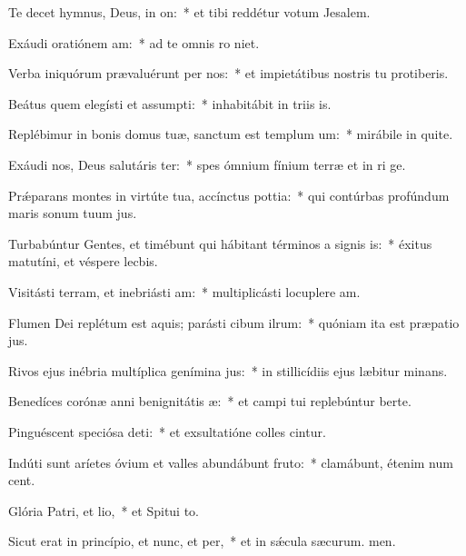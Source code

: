 \item Te decet hymnus, Deus, in on:~* et tibi reddétur votum  Jesalem.
\item Exáudi oratiónem am:~* ad te omnis ro niet.
\item Verba iniquórum prævaluérunt per nos:~* et impietátibus nostris tu protiberis.
\item Beátus quem elegísti et assumpti:~* inhabitábit in triis is.
\item Replébimur in bonis domus tuæ, sanctum est templum um:~* mirábile in quite.
\item Exáudi nos, Deus salutáris ter:~* spes ómnium fínium terræ et in ri ge.
\item Prǽparans montes in virtúte tua, accínctus pottia:~* qui contúrbas profúndum maris sonum tuum jus.
\item Turbabúntur Gentes, et timébunt qui hábitant términos a signis is:~* éxitus matutíni, et véspere lecbis.
\item Visitásti terram, et inebriásti am:~* multiplicásti locuplere am.
\item Flumen Dei replétum est aquis; parásti cibum ilrum:~* quóniam ita est præpatio jus.
\item Rivos ejus inébria multíplica genímina jus:~* in stillicídiis ejus læbitur minans.
\item Benedíces corónæ anni benignitátis æ:~* et campi tui replebúntur berte.
\item Pinguéscent speciósa deti:~* et exsultatióne colles cintur.
\item Indúti sunt aríetes óvium et valles abundábunt fruto:~* clamábunt, étenim num cent.
\item Glória Patri, et lio,~* et Spitui to.
\item Sicut erat in princípio, et nunc, et per,~* et in sǽcula sæcurum. men.
